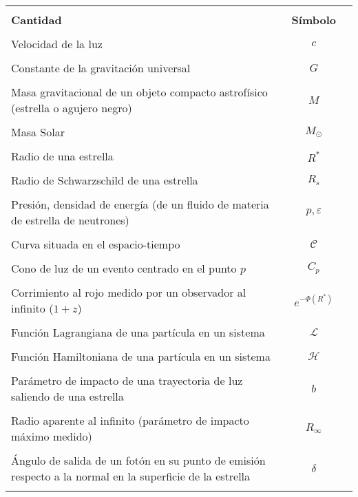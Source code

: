 \documentclass[letterpaper, twoside,openright]{book}
\newcommand{\MS}{}
\begin{document}
\begin{table}[h]
	\centering
	\begin{tabular}{lcc}
		\hline 
		& &  \\
		\textbf{Cantidad} & \textbf{Símbolo}& \\ && \\
		Velocidad de la luz & $c$ & \\&& \\
		Constante de la gravitación universal & $G$ & \\&& \\
		Masa gravitacional de un \MS{objeto compacto astrofísico (estrella o agujero negro)} & $M$ &\\&& \\
		Masa Solar & $M_{\odot}$ &\\&& \\
		Radio de una estrella & $R^*$ & \\ &&\\
		Radio de Schwarzschild de una estrella & $R_{s}$ &\\&& \\
		Presión, densidad de energía (de un fluido de materia de estrella de neutrones) & $p,\varepsilon$ & \\&&\\
		Curva situada en el espacio-tiempo & $\mathcal{C}$ &\\&& \\
		Cono de luz de un evento centrado en el punto $p$ & $C_p$ &\\&& \\
		Corrimiento al rojo medido por un observador al infinito ($1+z$) & $e^{-\Phi(R^*)}$ \\ && \\
		Función Lagrangiana de una partícula en un sistema & $\mathcal{L}$ &\\&& \\
		Función Hamiltoniana de una partícula en un sistema & $\mathcal{H}$ &\\&& \\
		Parámetro de impacto de una trayectoria de luz saliendo de una estrella & $b$ & \\&& \\
		Radio aparente al infinito (parámetro de impacto máximo medido) & $R_\infty$ & \\&& \\
		Ángulo de salida de un fotón en su punto de emisión respecto a la normal en la superficie de la estrella & $\delta$ & \\&& \\

\end{tabular}
\end{table}
\end{document}
